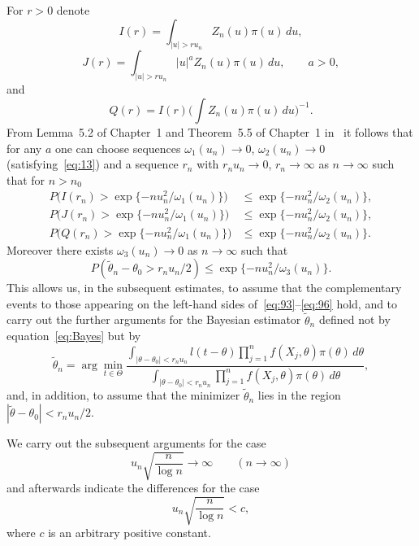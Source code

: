 \documentclass[11pt,a4paper]{article}
\begin{document}
For $r>0$ denote
\begin{equation}
I(r)=\int_{|u|>ru_n}Z_n(u)\pi(u)\,du,
\label{eq:90}
\end{equation}
\begin{equation}
J(r)=\int_{|u|>ru_n}|u|^a Z_n(u)\pi(u)\,du,\qquad a>0,
\label{eq:91}
\end{equation}
and
\begin{equation}
Q(r)=I(r)\Biggl(\int Z_n(u)\pi(u)\,du\Biggr)^{-1}.
\label{eq:92}
\end{equation}
From Lemma~5.2 of Chapter~1 and Theorem~5.5 of Chapter~1 in~\cite{10} it follows that for any $a$ one can choose sequences $\omega_1(u_n)\to0$, $\omega_2(u_n)\to0$ (satisfying~\eqref{eq:13}) and a sequence $r_n$ with $r_nu_n\to0$, $r_n\to\infty$ as $n\to\infty$ such that for $n>n_0$
\begin{align}
P\bigl(I(r_n)>\exp\{-nu_n^2/\omega_1(u_n)\}\bigr)&\le\exp\{-nu_n^2/\omega_2(u_n)\},
\label{eq:93}\\
P\bigl(J(r_n)>\exp\{-nu_n^2/\omega_1(u_n)\}\bigr)&\le\exp\{-nu_n^2/\omega_2(u_n)\},
\label{eq:94}\\
P\bigl(Q(r_n)>\exp\{-nu_n^2/\omega_1(u_n)\}\bigr)&\le\exp\{-nu_n^2/\omega_2(u_n)\}.
\label{eq:95}
\end{align}
Moreover there exists $\omega_3(u_n)\to0$ as $n\to\infty$ such that
\begin{equation}
P(\tilde\theta_n-\theta_0>r_nu_n/2)\le\exp\{-nu_n^2/\omega_3(u_n)\}.
\label{eq:96}
\end{equation}
This allows us, in the subsequent estimates, to assume that the complementary events to those appearing on the left-hand sides of~\eqref{eq:93}--\eqref{eq:96} hold, and to carry out the further arguments for the Bayesian estimator $\tilde\theta_n$ defined not by equation~\eqref{eq:Bayes} but by
\begin{equation}
\tilde\theta_n=\arg\min_{t\in\Theta}\frac{\displaystyle\int_{|\theta-\theta_0|<r_nu_n}l(t-\theta)\prod_{j=1}^n f(X_j,\theta)\pi(\theta)\,d\theta}{\displaystyle\int_{|\theta-\theta_0|<r_nu_n}\prod_{j=1}^n f(X_j,\theta)\pi(\theta)\,d\theta},
\label{eq:97}
\end{equation}
and, in addition, to assume that the minimizer $\tilde\theta_n$ lies in the region $|\tilde\theta-\theta_0|<r_nu_n/2$.

We carry out the subsequent arguments for the case
\begin{equation}
u_n\sqrt{\frac n{\log n}}\to\infty\qquad(n\to\infty)
\label{eq:98}
\end{equation}
and afterwards indicate the differences for the case
\begin{equation}
u_n\sqrt{\frac n{\log n}}<c,
\label{eq:99}
\end{equation}
where $c$ is an arbitrary positive constant.
\end{document}
